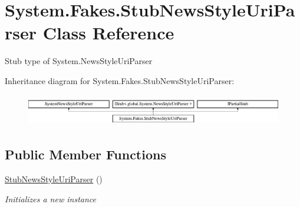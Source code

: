 \hypertarget{class_system_1_1_fakes_1_1_stub_news_style_uri_parser}{\section{System.\-Fakes.\-Stub\-News\-Style\-Uri\-Parser Class Reference}
\label{class_system_1_1_fakes_1_1_stub_news_style_uri_parser}
}


Stub type of System.\-News\-Style\-Uri\-Parser 


Inheritance diagram for System.\-Fakes.\-Stub\-News\-Style\-Uri\-Parser\-:\begin{figure}[H]
\begin{center}
\leavevmode
\includegraphics[height=1.398252cm]{class_system_1_1_fakes_1_1_stub_news_style_uri_parser}
\end{center}
\end{figure}
\subsection*{Public Member Functions}
\begin{DoxyCompactItemize}
\item 
\hyperlink{class_system_1_1_fakes_1_1_stub_news_style_uri_parser_a91314acec02aa2dee3d1a0e58f2553c6}{Stub\-News\-Style\-Uri\-Parser} ()
\begin{DoxyCompactList}\small\item\em Initializes a new instance\end{DoxyCompactList}\end{DoxyCompactItemize}
